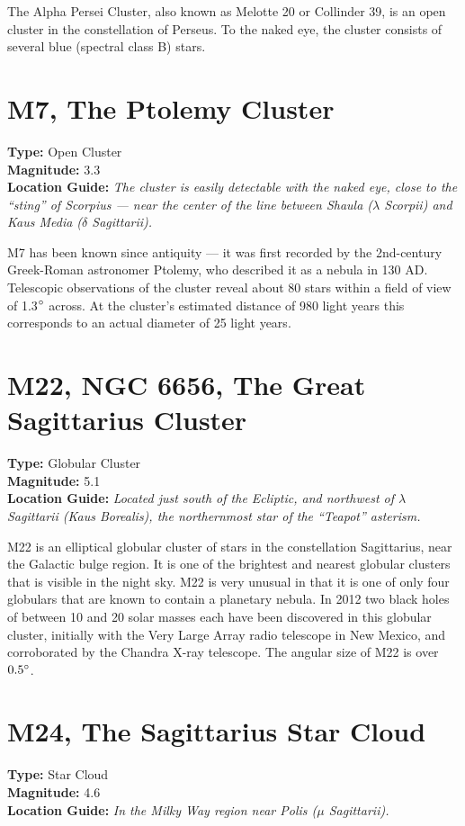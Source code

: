 The Alpha Persei Cluster, also known as Melotte 20 or Collinder 39, is
an open cluster in the constellation of Perseus. To the naked
eye, %
the cluster consists of several blue (spectral class B) stars.

\section{M7, The Ptolemy Cluster}
\textbf{Type:} Open Cluster \\
\textbf{Magnitude:} 3.3 \\
\textbf{Location Guide:} \textit{The cluster is easily detectable with
  the naked eye, close to the ``sting'' of Scorpius --- near the
  center of the line between Shaula ($\lambda$ Scorpii) and Kaus Media
  ($\delta$ Sagittarii).}

M7 has been known since antiquity --- it was first recorded by the
2nd-century Greek-Roman astronomer Ptolemy, who described it as a
nebula in 130 AD. Telescopic observations of the cluster reveal about
80 stars within a field of view of 1.3$\degree$ across. At the
cluster's estimated distance of 980 light years this corresponds to an
actual diameter of 25 light years.

\section{M22, NGC 6656, The Great Sagittarius Cluster} 
\textbf{Type:} Globular Cluster \\ 
\textbf{Magnitude:} 5.1 \\
\textbf{Location Guide:} \textit{Located just south of the Ecliptic, and northwest of $\lambda$ Sagittarii (Kaus Borealis), the northernmost star of the ``Teapot'' asterism.}

M22 is an elliptical globular cluster of stars in the constellation Sagittarius, near the Galactic bulge region.
It is one of the brightest and nearest globular clusters that is visible in the night sky.
M22 is very unusual in that it is one of only four globulars that are known to contain a planetary nebula.
In 2012 two black holes of between 10 and 20 solar masses each have been discovered in this globular cluster,
initially with the Very Large Array radio telescope in New Mexico, and corroborated by the Chandra X-ray telescope.
The angular size of M22 is over $0.5\degree$.

\section{M24, The Sagittarius Star Cloud}
\textbf{Type:} Star Cloud \\
\textbf{Magnitude:} 4.6 \\ 
\textbf{Location Guide:} \textit{In the Milky Way region near Polis ($\mu$ Sagittarii).}

